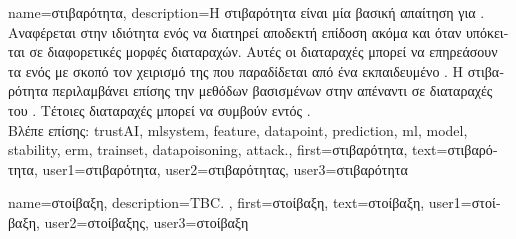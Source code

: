 {name={\foreignlanguage{greek}{στιβαρότητα}},
	description={\foreignlanguage{greek}{Η στιβαρότητα είναι μία βασική απαίτηση για} 
		. \foreignlanguage{greek}{Αναφέρεται στην ιδιότητα ενός}  
		\foreignlanguage{greek}{να διατηρεί αποδεκτή επίδοση ακόμα και όταν υπόκειται σε διαφορετικές μορφές 
		διαταραχών. Αυτές οι διαταραχές μπορεί να επηρεάσουν τα}  \foreignlanguage{greek}{ενός} 
		 \foreignlanguage{greek}{με σκοπό τον χειρισμό της}  
		\foreignlanguage{greek}{που παραδίδεται από ένα εκπαιδευμένο}  . 
		\foreignlanguage{greek}{Η στιβαρότητα περιλαμβάνει επίσης την}  \foreignlanguage{greek}{μεθόδων 
		βασισμένων στην}  \foreignlanguage{greek}{απέναντι σε διαταραχές του} . 
		\foreignlanguage{greek}{Τέτοιες διαταραχές μπορεί να συμβούν εντός}  . 
		\\
		\foreignlanguage{greek}{Βλέπε επίσης:} \gls{trustAI}, \gls{mlsystem}, \gls{feature}, \gls{datapoint}, \gls{prediction}, 
		\gls{ml}, \gls{model}, \gls{stability}, \gls{erm}, \gls{trainset}, \gls{datapoisoning}, \gls{attack}.}, 
	first={\foreignlanguage{greek}{στιβαρότητα}}, 
	text={\foreignlanguage{greek}{στιβαρότητα}},
	user1={\foreignlanguage{greek}{στιβαρότητα}}, %
  	user2={\foreignlanguage{greek}{στιβαρότητας}}, %
	user3={\foreignlanguage{greek}{στιβαρότητα}} %
}%

{name={\foreignlanguage{greek}{στοίβαξη}}, 
	description={TBC. },
	first={\foreignlanguage{greek}{στοίβαξη}},
	text={\foreignlanguage{greek}{στοίβαξη}},
	user1={\foreignlanguage{greek}{στοίβαξη}}, %
	user2={\foreignlanguage{greek}{στοίβαξης}}, %
	user3={\foreignlanguage{greek}{στοίβαξη}} %
}

